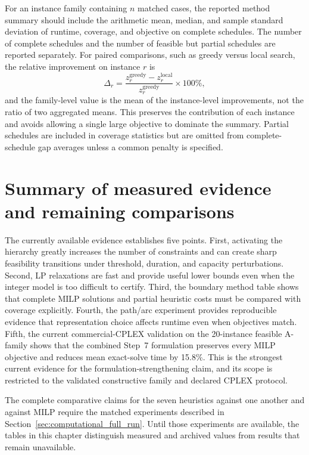 For an instance family containing $n$ matched cases, the reported method
summary should include the arithmetic mean, median, and sample standard
deviation of runtime, coverage, and objective on complete schedules. The number
of complete schedules and the number of feasible but partial schedules are
reported separately. For paired comparisons, such as greedy versus local
search, the relative improvement on instance $r$ is
\begin{equation}
  \Delta_r =
  \frac{z_r^{\mathrm{greedy}}-z_r^{\mathrm{local}}}
     {z_r^{\mathrm{greedy}}}\times 100\%,
\end{equation}
and the family-level value is the mean of the instance-level improvements,
not the ratio of two aggregated means. This preserves the contribution of
each instance and avoids allowing a single large objective to dominate the
summary. Partial schedules are included in coverage statistics but are omitted
from complete-schedule gap averages unless a common penalty is specified.

\section{Summary of measured evidence and remaining comparisons}
\label{sec:computational_summary}

The currently available evidence establishes five points. First, activating
the hierarchy greatly increases the number of constraints and can create sharp
feasibility transitions under threshold, duration, and capacity perturbations.
Second, LP relaxations are fast and provide useful lower bounds even when the
integer model is too difficult to certify. Third, the boundary method table
shows that complete MILP solutions and partial heuristic costs must be compared
with coverage explicitly. Fourth, the path/arc experiment provides reproducible
evidence that representation choice affects runtime even when objectives match.
Fifth, the current commercial-CPLEX validation on the 20-instance feasible
A-family shows that the combined Step~7 formulation preserves every MILP
objective and reduces mean exact-solve time by 15.8\%. This is the strongest
current evidence for the formulation-strengthening claim, and its scope is
restricted to the validated constructive family and declared CPLEX protocol.

The complete comparative claims for the seven heuristics against one another
and against MILP require the matched experiments described in
Section~\ref{sec:computational_full_run}. Until those experiments are available,
the tables in this chapter distinguish measured and archived values from
results that remain unavailable.

